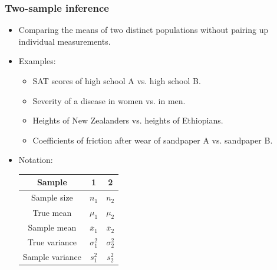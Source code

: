 \documentclass[handout]{beamer}\usepackage[]{graphicx}\usepackage[]{color}
\providecommand{\ov}[1]{\overline{#1}}
\numberwithin{equation}{section}
\begin{document}
\begin{frame}
\frametitle{Two-sample inference}
\begin{itemize}
\item Comparing the means of two distinct populations without pairing up individual measurements.
\pause \item Examples:
\begin{itemize}
\item SAT scores of high school A vs. high school B.
\pause \item Severity of a disease in women vs. in men. 
\pause \item Heights of New Zealanders vs. heights of Ethiopians.
\pause \item Coefficients of friction after wear of sandpaper A vs. sandpaper B.
\end{itemize}
\pause \item Notation:
\begin{center}
\begin{tabular}{ccc}
Sample & 1 & 2 \\ \hline
Sample size & $n_1$ & $n_2$ \\ [1ex]
True mean & $\mu_1$ & $\mu_2$ \\ [1ex] 
Sample mean & $\ov{x}_1$ & $\ov{x}_2$ \\ [1ex]
True variance & $\sigma^2_1$ & $\sigma^2_2$ \\ [1ex]
Sample variance & $s^2_1$ & $s^2_2$ 
\end{tabular}
\end{center}

\end{itemize}
\end{frame}
\end{document}
